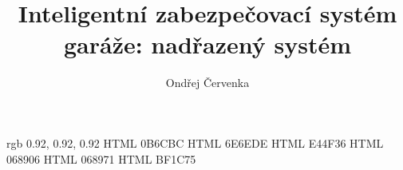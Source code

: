 \documentclass[thesis=M,czech]{templates/FITthesis}[2012/06/26]
\title{Inteligentní zabezpečovací systém garáže: nadřazený systém}
\author{Ondřej Červenka} %
\begin{document}
\definecolor {codebg} {rgb} {0.92, 0.92, 0.92}
\definecolor {blue} {HTML} {0B6CBC}
\definecolor {blue2} {HTML} {6E6EDE}
\definecolor {red} {HTML} {E44F36}
\definecolor {green} {HTML} {068906}
\definecolor {cyan} {HTML} {068971}
\definecolor {magenta} {HTML} {BF1C75}


\begin{introduction}
	
\end{introduction}







\begin{conclusion}
	
\end{conclusion}




\appendix



\end{document}
